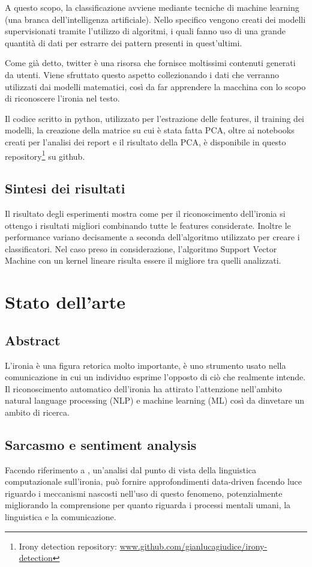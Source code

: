 \documentclass[oneside]{book}
\begin{document}
A questo scopo, la classificazione avviene mediante tecniche di machine learning (una branca dell'intelligenza artificiale). Nello specifico vengono creati dei modelli supervisionati tramite l'utilizzo di algoritmi, i quali fanno uso di una grande quantità di dati per estrarre dei pattern presenti in quest'ultimi.

Come già detto, twitter è una risorsa che fornisce moltissimi contenuti generati da utenti. Viene sfruttato questo aspetto collezionando i dati che verranno utilizzati dai modelli matematici, così da far apprendere la macchina con lo scopo di riconoscere l'ironia nel testo.

Il codice scritto in python, utilizzato per l'estrazione delle features, il training dei modelli, la creazione della matrice su cui è stata fatta PCA, oltre ai notebooks creati per l'analisi dei report e il risultato della PCA, è disponibile in questo repository\footnote{Irony detection repository: \url{www.github.com/gianlucagiudice/irony-detection}} su github.

\section{Sintesi dei risultati}
Il risultato degli esperimenti mostra come per il riconoscimento dell'ironia si ottengo i risultati migliori combinando tutte le features considerate. Inoltre le performance variano decisamente a seconda dell'algoritmo utilizzato per creare i classificatori. Nel caso preso in considerazione, l'algoritmo Support Vector Machine con un kernel lineare risulta essere il migliore tra quelli analizzati.

\chapter{Stato dell'arte}

\section*{Abstract}
L'ironia è una figura retorica molto importante, è uno strumento usato nella comunicazione in cui un individuo esprime l'opposto di ciò che realmente intende. Il riconoscimento automatico dell'ironia ha attirato l'attenzione nell'ambito natural language
processing (NLP) e machine learning (ML) così da dinvetare un ambito di ricerca. 

\section{Sarcasmo e sentiment analysis}
Facendo riferimento a \cite{survey4}, un'analisi dal punto di vista della linguistica computazionale sull'ironia, può fornire approfondimenti data-driven facendo luce riguardo i meccanismi nascosti nell'uso di questo fenomeno, potenzialmente migliorando la comprensione per quanto riguarda i processi mentali umani, la linguistica e la comunicazione. 
\end{document}
